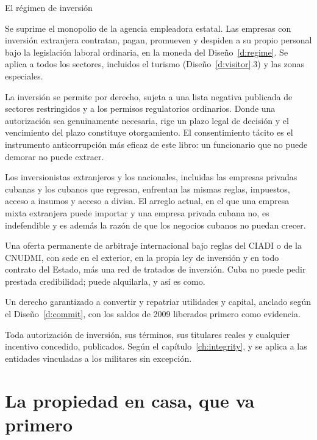 \begin{design}{El régimen de inversión}
\label{d:invest}
\begin{rules}
 Se suprime el monopolio de la agencia empleadora estatal. Las empresas
con inversión extranjera contratan, pagan, promueven y despiden a su propio personal bajo la
legislación laboral ordinaria, en la moneda del Diseño~\ref{d:regime}. Se aplica a todos los
sectores, incluidos el turismo (Diseño~\ref{d:visitor}.3) y las zonas especiales.

 La inversión se permite por derecho, sujeta a una
lista negativa publicada de sectores restringidos y a los permisos regulatorios ordinarios.
Donde una autorización sea genuinamente necesaria, rige un plazo legal de decisión y el
vencimiento del plazo constituye otorgamiento. El consentimiento tácito es el instrumento
anticorrupción más eficaz de este libro: un funcionario que no puede demorar no puede extraer.

 Los inversionistas extranjeros y los nacionales, incluidas las empresas
privadas cubanas y los cubanos que regresan, enfrentan las mismas reglas, impuestos, acceso a
insumos y acceso a divisa. El arreglo actual, en el que una empresa mixta extranjera puede
importar y una empresa privada cubana no, es indefendible y es además la razón de que los
negocios cubanos no puedan crecer.

 Una oferta permanente de arbitraje internacional bajo reglas del CIADI o de la
CNUDMI, con sede en el exterior, en la propia ley de inversión y en todo contrato del Estado,
más una red de tratados de inversión. Cuba no puede pedir prestada credibilidad; puede
alquilarla, y así es como.

 Un derecho garantizado a convertir y repatriar utilidades y capital,
anclado según el Diseño~\ref{d:commit}, con los saldos de 2009 liberados primero como
evidencia.

 Toda autorización de inversión, sus términos, sus titulares reales
y cualquier incentivo concedido, publicados. Según el capítulo~\ref{ch:integrity}, y se aplica
a las entidades vinculadas a los militares sin excepción.
\end{rules}
\end{design}

\section{La propiedad en casa, que va primero}

